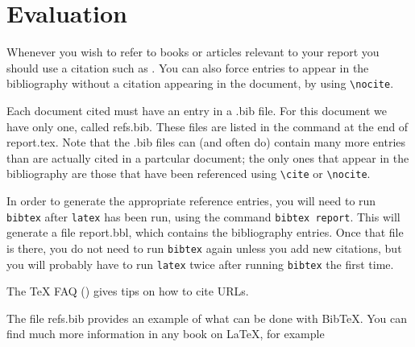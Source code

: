 \chapter{Evaluation}
Whenever you wish to refer to books or articles relevant to your report
you should use a citation such as \cite{lamport}. You can also force
entries to appear in the bibliography without  a citation appearing in
the document, by using \verb=\nocite=.  

\nocite{boyle,rd-only} 

Each document cited must have an entry in a \textsf{.bib} file. For this
document we have only one, called \textsf{refs.bib}. These files are
listed in the \verb== command at the end of
\textsf{report.tex}. Note that the \textsf{.bib} files can (and often
do) contain many more entries than are actually cited in a partcular
document; the only ones that appear in the bibliography are those that
have been referenced using \verb=\cite= or \verb=\nocite=.

In order to generate the appropriate reference entries, you will need
to run \texttt{bibtex} after \texttt{latex} has been run, using the
command \texttt{bibtex report}. This will generate a file
\textsf{report.bbl}, which contains the bibliography entries. Once
that file is there, you do not need to run \texttt{bibtex} again
unless you add new citations, but you will probably have to run
\texttt{latex} twice after running \texttt{bibtex} the first time.

The \TeX{} FAQ (\cite{url-cite}) gives tips on how to cite URLs.

The file \textsf{refs.bib} provides an example of what can be done
with Bib\TeX. You can find much more information in any book on
\LaTeX, for example 

